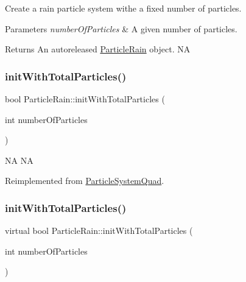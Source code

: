 Create a rain particle system withe a fixed number of particles.


\begin{DoxyParams}{Parameters}
{\em number\+Of\+Particles} & A given number of particles. \\
\hline
\end{DoxyParams}
\begin{DoxyReturn}{Returns}
An autoreleased \hyperlink{classParticleRain}{Particle\+Rain} object.  NA 
\end{DoxyReturn}
\mbox{\label{classParticleRain_a5fa80a9b8344c32f946f16a4626d6719}} 
\subsubsection{\texorpdfstring{init\+With\+Total\+Particles()}{initWithTotalParticles()}\hspace{0.1cm}{\footnotesize\ttfamily [1/2]}}
{\footnotesize\ttfamily bool Particle\+Rain\+::init\+With\+Total\+Particles (\begin{DoxyParamCaption}\item[{int}]{number\+Of\+Particles }\end{DoxyParamCaption})\hspace{0.3cm}{\ttfamily [virtual]}}

NA  NA 

Reimplemented from \hyperlink{classParticleSystemQuad_ae5420007b57e909c05e7476a54fbfbe9}{Particle\+System\+Quad}.

\mbox{\label{classParticleRain_a895dfc2e55e4dc66b927ed78dbf8ba34}} 
\subsubsection{\texorpdfstring{init\+With\+Total\+Particles()}{initWithTotalParticles()}\hspace{0.1cm}{\footnotesize\ttfamily [2/2]}}
{\footnotesize\ttfamily virtual bool Particle\+Rain\+::init\+With\+Total\+Particles (\begin{DoxyParamCaption}\item[{int}]{number\+Of\+Particles }\end{DoxyParamCaption})\hspace{0.3cm}{\ttfamily [virtual]}}

